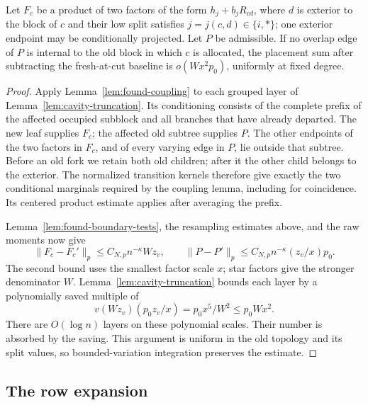 \begin{lemma}\label{lem:cavity-boundary}
Let \(F_c\) be a product of two factors of the form
\(h_j+b_jR_{cd}\), where \(d\) is exterior to the block of
\(c\) and their low split satisfies \(j=j(c,d)\in\{i,*\}\);
one exterior endpoint
may be conditionally projected. Let \(P\) be admissible.
If no overlap edge of \(P\) is
internal to the old block in which \(c\) is allocated,
the placement sum after subtracting the fresh-at-cut
baseline is \(o(Wx^2p_0)\), uniformly at fixed degree.
\end{lemma}

\begin{proof}
Apply Lemma~\ref{lem:found-coupling} to each grouped layer of
Lemma~\ref{lem:cavity-truncation}. Its conditioning consists of the
complete prefix of the affected occupied subblock and all branches
that have already departed. The new leaf supplies \(F_c\); the
affected old subtree supplies \(P\). The other endpoints of the
two factors in \(F_c\), and of every varying edge in \(P\), lie
outside that subtree. Before an old fork we retain both old children;
after it the other child belongs to the exterior. The normalized
transition kernels therefore give exactly the two conditional
marginals required by the coupling lemma, including for coincidence.
Its centered product estimate applies after averaging the prefix.

Lemma~\ref{lem:found-boundary-tests}, the resampling estimates above,
and the raw moments now give
\[
 \|F_c-F_c'\|_p\le C_{N,p}n^{-\kappa}Wz_v,\qquad
 \|P-P'\|_p\le C_{N,p}n^{-\kappa}(z_v/x)p_0.
\]
The second bound uses the smallest factor scale \(x\);
star factors give the stronger denominator \(W\).
Lemma~\ref{lem:cavity-truncation} bounds each layer by a
polynomially saved multiple of
\[
             v(Wz_v)(p_0z_v/x)=p_0x^5/W^2\le p_0Wx^2.
\]
There are \(O(\log n)\) layers on these polynomial scales.
Their number is absorbed by the saving. This argument
is uniform in the old topology and its split values,
so bounded-variation integration preserves the estimate.
\end{proof}

\subsection{The row expansion}\label{subsec:cavity-row-expansion}


